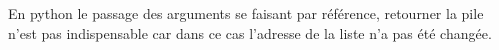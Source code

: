 \documentclass[10pt,fleqn]{article} %
\begin{document}
%
%
%


\begin{rem}
En python le passage des arguments se faisant par référence, retourner la pile n'est pas indispensable car dans ce cas l'adresse de la liste n'a pas été changée.
\end{rem}
\end{document}
